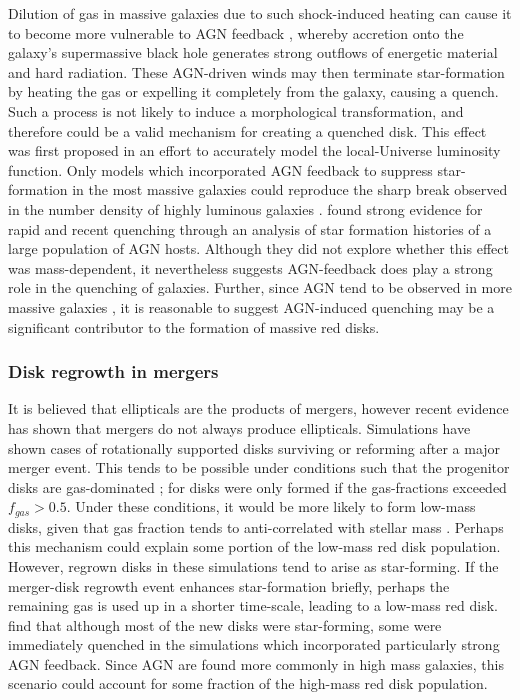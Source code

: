 \documentclass[useAMS,usenatbib]{mn2e}
\begin{document}
Dilution of gas in massive galaxies due to such shock-induced heating can cause it to become more vulnerable to AGN feedback \citep{Dekel2006}, whereby accretion onto the galaxy's supermassive black hole generates strong outflows of energetic material and hard radiation. These AGN-driven winds may then terminate star-formation by heating the gas or expelling it completely from the galaxy, causing a quench. Such a process is not likely to induce a morphological transformation, and therefore could be a valid mechanism for creating a quenched disk. This effect was first proposed in an effort to accurately model the local-Universe luminosity function. Only models which incorporated AGN feedback to suppress star-formation in the most massive galaxies could reproduce the sharp break observed in the number density of highly luminous galaxies \citep{Benson2003,DiMatteo2005,Bower2006,Croton2006,Somerville2008}. \citet{Smethurst2016} found strong evidence for rapid and recent quenching through an analysis of star formation histories of a large population of AGN hosts. Although they did not explore whether this effect was mass-dependent, it nevertheless suggests AGN-feedback does play a strong role in the quenching of galaxies. Further, since AGN tend to be observed in more massive galaxies \citep{Schawinski2007,Lee2012,Oh2012,Alonso2013,Galloway2015}, it is reasonable to suggest AGN-induced quenching may be a significant contributor to the formation of massive red disks. 

\subsubsection{Disk regrowth in mergers}

It is believed that ellipticals are the products of mergers, however recent evidence has shown that mergers do not always produce ellipticals. Simulations have shown cases of rotationally supported disks surviving or reforming after a major merger event. This tends to be possible under conditions such that the progenitor disks are gas-dominated \citep{Governato2009,Springel2005a}; for \citet{Robertson2006} disks were only formed if the gas-fractions exceeded $f_{gas}>0.5$. Under these conditions, it would be more likely to form low-mass disks, given that gas fraction tends to anti-correlated with stellar mass \citep{Kannappan2004,Bell2000}. Perhaps this mechanism could explain some portion of the low-mass red disk population. However, regrown disks in these simulations tend to arise as star-forming. If the merger-disk regrowth event enhances star-formation briefly, perhaps the remaining gas is used up in a shorter time-scale, leading to a low-mass red disk. \citet{Sparre2017} find that although most of the new disks were star-forming, some were immediately quenched in the simulations which incorporated particularly strong AGN feedback. Since AGN are found more commonly in high mass galaxies, this scenario could account for some fraction of the high-mass red disk population.
\end{document}
